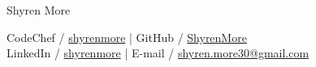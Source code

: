 \documentclass[a4,10pt]{article}
\begin{document}

\begin{flushleft}

    \begin{minipage}[b]{0.5\textwidth}
    {\Huge Shyren More} \\ 
    \end{minipage}%


    CodeChef / \href{https://www.codechef.com/users/shyren_more}{shyren\textunderscore more} | GitHub / \href{https://github.com/ShyrenMore}{ ShyrenMore} \\
    \vspace{0.1cm}
    LinkedIn / \href{https://linkedin.com/in/shyrenmore/}{ shyrenmore} |     E-mail / \href{mailto:shyren.more30@gmail.com}{shyren.more30@gmail.com} \\
    \vspace{0.1cm}
    
\end{flushleft}
             
             
    
\end{document}
